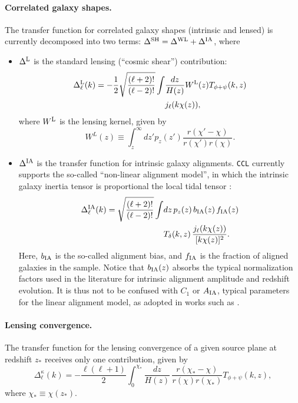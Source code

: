 \documentclass[\docopts]{\docclass}
\newcommand{\ccl}{{\tt CCL}\xspace}
\begin{document}
\paragraph{\bf Correlated galaxy shapes.} The transfer function for correlated galaxy shapes (intrinsic and lensed) is currently decomposed into two terms: $\Delta^{\rm SH}=\Delta^{\rm WL}+\Delta^{\rm IA}$, where
\begin{itemize}
  \item $\Delta^{\rm L}$ is the standard lensing (``cosmic shear'') contribution:
    \begin{align} \label{eq:transfer_lensing}
      \nonumber
      \Delta_\ell^{\rm L}(k)=-\frac{1}{2}\sqrt{\frac{(\ell+2)!}{(\ell-2)!}}\int &\frac{dz}{H(z)} W^{\rm L}(z)T_{\phi+\psi}(k,z)\\
      &j_\ell(k\chi(z)),
    \end{align}
    where $W^{\rm L}$ is the lensing kernel, given by
    \begin{equation}
      W^L(z)\equiv\int_z^\infty dz' p_z(z')\frac{r(\chi'-\chi)}{r(\chi')r(\chi)}.
    \end{equation}
  \item $\Delta^{\rm IA}$ is the transfer function for intrinsic galaxy alignments. \ccl currently supports the so-called ``non-linear alignment model'', in which the intrinsic galaxy inertia tensor is proportional the local tidal tensor \cite{2004PhRvD..70f3526H,2007MNRAS.381.1197H}:
    \begin{align}\nonumber
      \Delta_\ell^{\rm IA}(k)=\sqrt{\frac{(\ell+2)!}{(\ell-2)!}}\int &dz\,p_z(z)\,b_{\rm IA}(z)\,f_{\rm IA}(z)\\
      &T_\delta(k,z)\,\frac{j_\ell(k\chi(z))}{[k\chi(z)]^2}.
    \end{align}
    Here, $b_{\rm IA}$ is the so-called alignment bias, and $f_{\rm IA}$ is the fraction of aligned galaxies in the sample. Notice that $b_{\rm IA}(z)$ absorbs the typical normalization factors used in the literature for intrinsic alignment amplitude and redshift evolution. It is thus not to be confused with $C_1$ or $A_{\rm IA}$, typical parameters for the linear alignment model, as adopted in works such as \cite{Blazek17,vanUitert18,Joudaki18,Hildebrandt17}.
\end{itemize}

\paragraph{\bf Lensing convergence.} The transfer function for the lensing convergence of a given source plane at redshift $z_*$ receives only one contribution, given by
\begin{equation}
  \Delta_\ell^\kappa(k)=-\frac{\ell(\ell+1)}{2}\int_0^{\chi_*}\frac{dz}{H(z)}\,\frac{r(\chi_*-\chi)}{r(\chi)r(\chi_*)}T_{\phi+\psi}(k,z),
  \label{eq:cmblens}
\end{equation}
where $\chi_*\equiv\chi(z_*)$.
\end{document}
